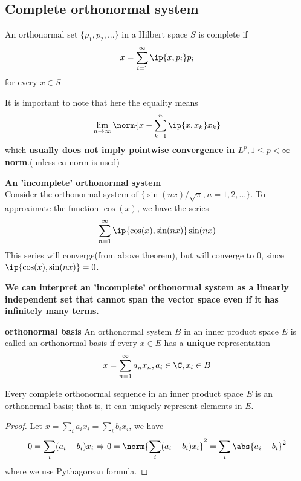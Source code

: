 \begin{refsection}
\subsection{Complete orthonormal system}
\begin{definition}[completeness]
	\cite[187]{moon2000mathematical}\cite[109]{debnath2005hilbert}An orthonormal set $\{p_1,p_2,...\}$ in a Hilbert space $S$ is complete if
	$$x = \sum_{i=1}^\infty \ip{x,p_i}p_i$$
	for every $x\in S$
\end{definition}


\begin{remark}
	It is important to note that here the equality means
	$$\lim_{n\to \infty} \norm{x - \sum_{k=1}^n \ip{x,x_k}x_k}$$
	which \textbf{usually does not imply pointwise convergence in $L^p,1\leq p <\infty$ norm}.(unless $\infty$ norm is used)
\end{remark}


\begin{mdframed}
	\textbf{An 'incomplete' orthonormal system}\\
	Consider the orthonormal system of $\{\sin(nx)/\sqrt{\pi},n=1,2,...\}$. To approximate the function $\cos(x)$, we have the series 
	$$\sum_{n=1}^\infty \ip{\cos(x),\sin(nx)}\sin(nx)$$
	This series will converge(from above theorem), but will converge to 0, since $\ip{\cos(x),\sin(nx)} = 0$.
	
	\textbf{We can interpret an 'incomplete' orthonormal system as a linearly independent set that cannot span the vector space even if it has infinitely many terms.}
\end{mdframed}


\begin{definition}\textbf{orthonormal basis}
	An orthonormal system $B$ in an inner product space $E$ is called an orthonormal basis if every $x\in E$ has a \textbf{unique} representation
	$$x = \sum_{n=1}^\infty a_n x_n,a_i\in \C, x_i\in B$$
\end{definition}

\begin{theorem}
	Every complete orthonormal sequence in an inner product space $E$ is an orthonormal basis; that is, it can uniquely represent elements in $E$.
\end{theorem}
\begin{proof}
	Let $x = \sum_{i} a_i x_i = \sum_i b_i x_i$, we have
	$$0 = \sum_i (a_i - b_i)x_i \Rightarrow 0 = \norm{\sum_i (a_i - b_i)x_i}^2 = \sum_i \abs{a_i-b_i}^2$$
	where we use Pythagorean formula.	
\end{proof}





\end{refsection}
